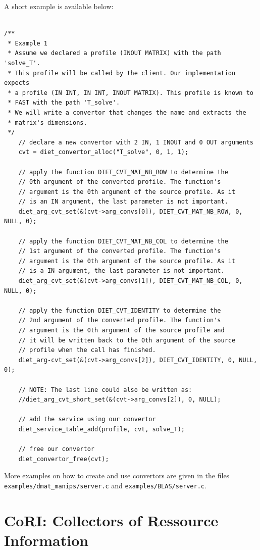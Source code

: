 \noindent A short example is available below:
\footnotesize
\begin{verbatim}

/**
 * Example 1
 * Assume we declared a profile (INOUT MATRIX) with the path 'solve_T'.
 * This profile will be called by the client. Our implementation expects
 * a profile (IN INT, IN INT, INOUT MATRIX). This profile is known to
 * FAST with the path 'T_solve'.
 * We will write a convertor that changes the name and extracts the
 * matrix's dimensions.
 */
    // declare a new convertor with 2 IN, 1 INOUT and 0 OUT arguments
    cvt = diet_convertor_alloc("T_solve", 0, 1, 1);

    // apply the function DIET_CVT_MAT_NB_ROW to determine the
    // 0th argument of the converted profile. The function's
    // argument is the 0th argument of the source profile. As it
    // is an IN argument, the last parameter is not important.
    diet_arg_cvt_set(&(cvt->arg_convs[0]), DIET_CVT_MAT_NB_ROW, 0, NULL, 0);

    // apply the function DIET_CVT_MAT_NB_COL to determine the
    // 1st argument of the converted profile. The function's
    // argument is the 0th argument of the source profile. As it
    // is a IN argument, the last parameter is not important.
    diet_arg_cvt_set(&(cvt->arg_convs[1]), DIET_CVT_MAT_NB_COL, 0, NULL, 0);

    // apply the function DIET_CVT_IDENTITY to determine the
    // 2nd argument of the converted profile. The function's
    // argument is the 0th argument of the source profile and
    // it will be written back to the 0th argument of the source
    // profile when the call has finished.
    diet_arg-cvt_set(&(cvt->arg_convs[2]), DIET_CVT_IDENTITY, 0, NULL, 0);

    // NOTE: The last line could also be written as:
    //diet_arg_cvt_short_set(&(cvt->arg_convs[2]), 0, NULL);

    // add the service using our convertor
    diet_service_table_add(profile, cvt, solve_T);

    // free our convertor
    diet_convertor_free(cvt);
\end{verbatim}
\normalsize

\noindent More examples on how to create and use convertors are given in the
files\\ \texttt{examples/dmat\_manips/server.c} and
\texttt{examples/BLAS/server.c}.

\section{CoRI: Collectors of Ressource Information}
\label{sec:CORI}

